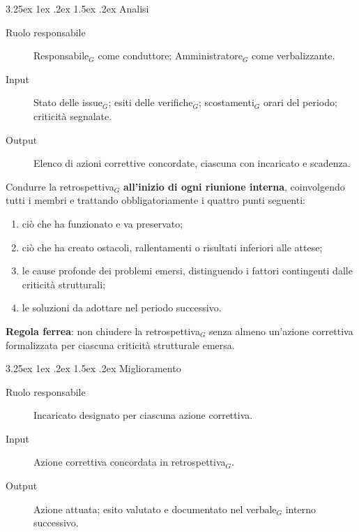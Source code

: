 \documentclass[a4paper, 10pt]{article}
\makeatletter
\renewcommand\paragraph{\@startsection{paragraph}{4}{\z@}%
  {3.25ex \@plus1ex \@minus .2ex}%
  {1.5ex \@plus .2ex}%
  {\normalfont\normalsize\bfseries}}
\makeatother
\begin{document}
\paragraph{Analisi}

\begin{description}
    \item[Ruolo responsabile] Responsabile$_G$ come conduttore; Amministratore$_G$ come verbalizzante.
    \item[Input] Stato delle issue$_G$; esiti delle verifiche$_G$; scostamenti$_G$ orari del periodo; criticità segnalate.
    \item[Output] Elenco di azioni correttive concordate, ciascuna con incaricato e scadenza.
\end{description}

\noindent Condurre la retrospettiva$_G$ \textbf{all'inizio di ogni riunione interna}, coinvolgendo tutti i membri e trattando obbligatoriamente i quattro punti seguenti:
\begin{enumerate}
    \item ciò che ha funzionato e va preservato;
    \item ciò che ha creato ostacoli, rallentamenti o risultati inferiori alle attese;
    \item le cause profonde dei problemi emersi, distinguendo i fattori contingenti dalle criticità strutturali;
    \item le soluzioni da adottare nel periodo successivo.
\end{enumerate}

\noindent \textbf{Regola ferrea}: non chiudere la retrospettiva$_G$ senza almeno un'azione correttiva formalizzata per ciascuna criticità strutturale emersa.

\paragraph{Miglioramento}

\begin{description}
    \item[Ruolo responsabile] Incaricato designato per ciascuna azione correttiva.
    \item[Input] Azione correttiva concordata in retrospettiva$_G$.
    \item[Output] Azione attuata; esito valutato e documentato nel verbale$_G$ interno successivo.
\end{description}
\end{document}
